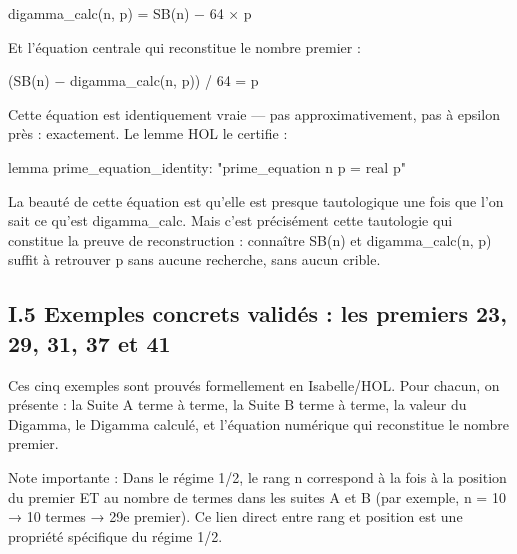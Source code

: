 \documentclass[11pt,a4paper]{article}
\begin{document}
digamma\_calc(n, p) = SB(n) − 64 × p

Et l'équation centrale qui reconstitue le nombre premier :

(SB(n) − digamma\_calc(n, p)) / 64 = p

Cette équation est identiquement vraie — pas approximativement, pas à epsilon près : exactement. Le lemme HOL le certifie :

\begin{holcode}[title={Code HOL — Identité de reconstruction du premier}]
lemma prime_equation_identity:
 "prime_equation n p = real p"
\end{holcode}

La beauté de cette équation est qu'elle est presque tautologique une fois que l'on sait ce qu'est digamma\_calc. Mais c'est précisément cette tautologie qui constitue la preuve de reconstruction : connaître SB(n) et digamma\_calc(n, p) suffit à retrouver p sans aucune recherche, sans aucun crible.

\subsection{I.5 Exemples concrets validés : les premiers 23, 29, 31, 37 et 41}

Ces cinq exemples sont prouvés formellement en Isabelle/HOL. Pour chacun, on présente : la Suite A terme à terme, la Suite B terme à terme, la valeur du Digamma, le Digamma calculé, et l'équation numérique qui reconstitue le nombre premier.

Note importante : Dans le régime 1/2, le rang n correspond à la fois à la position du premier ET au nombre de termes dans les suites A et B (par exemple, n = 10 → 10 termes → 29e premier). Ce lien direct entre rang et position est une propriété spécifique du régime 1/2.
\end{document}
